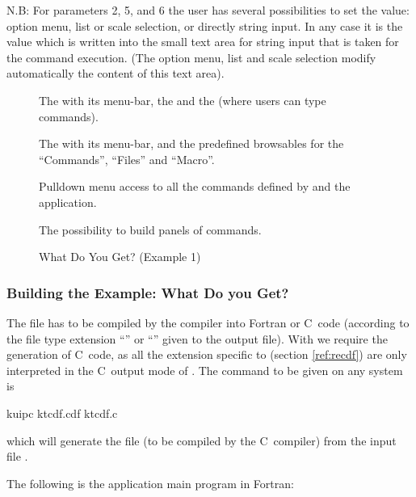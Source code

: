 N.B: For parameters 2, 5, and 6 the user has several possibilities
to set the value: option menu, list or scale selection,
or directly string input. In any case it is the value which is written into 
the small text area for string input that is taken for the command execution.
(The option menu, list and scale selection modify automatically the content of 
this text area).

\begin{figure}[htb]\centering
\vspace{-1\baselineskip}
\vspace{-2\baselineskip}
\begin{EnumZB}
\item The \EW{} with its menu-bar, the \TP{} and the \INP{} (where users
can type commands).
\item The \MB{}  with its menu-bar, and the predefined \KUIP{} browsables for
the ``Commands'', ``Files'' and ``Macro''.
\item Pulldown menu access to all the commands defined by \KUIP{} and the 
application.
\item The possibility to build panels of commands.
\vspace{-1\baselineskip}
\end{EnumZB}
\caption{What Do You Get? (Example 1)}
\label{ref:FIGPKEX2}
\end{figure}

\subsubsection{Building the Example: What Do you Get?}

The \CDF{} file has to be compiled by the \KUIPC{} compiler into Fortran 
or C~code (according to the file type extension ``'' or
``'' given to  
the output file). 
With \KUIPMotif{} we require the generation of C~code,
as all the \CDF{} extension specific to \Motif{} (section \ref{ref:recdf})
are only interpreted in the C~output mode of \KUIPC{}. 
The command to be given on any system is
\begin{XMP}
kuipc ktcdf.cdf ktcdf.c
\end{XMP}
which will generate the file 
(to be compiled by the C~compiler)
from the input file .

The following is the application main program in Fortran:

